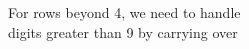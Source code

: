\documentclass[preview]{standalone}
\begin{document}
\begin{center}
For rows beyond 4, we need to handle\\digits greater than 9 by carrying over
\end{center}
\end{document}
